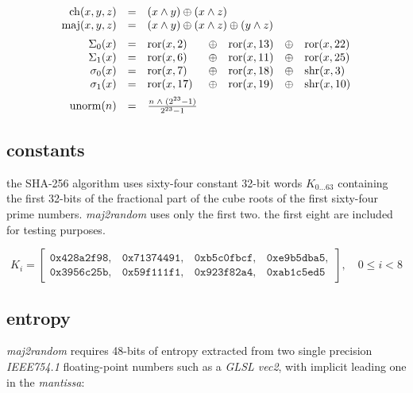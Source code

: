 \documentclass{scrartcl}
\begin{document}
\[
\begin{array}{rclclcl}
\mathrm{ch}(x,y,z)  & = & \multicolumn{5}{l}{(x \land y) \oplus (x \land z)} \\
\mathrm{maj}(x,y,z) & = & \multicolumn{5}{l}{(x \land y) \oplus (x \land z) \oplus (y \land z)} \\[0.5em]
\Sigma_0(x) & = & \mathrm{ror}(x,2)  & \oplus & \mathrm{ror}(x,13) & \oplus & \mathrm{ror}(x,22) \\
\Sigma_1(x) & = & \mathrm{ror}(x,6)  & \oplus & \mathrm{ror}(x,11) & \oplus & \mathrm{ror}(x,25) \\
\sigma_0(x) & = & \mathrm{ror}(x,7)  & \oplus & \mathrm{ror}(x,18) & \oplus & \mathrm{shr}(x,3) \\
\sigma_1(x) & = & \mathrm{ror}(x,17) & \oplus & \mathrm{ror}(x,19) & \oplus & \mathrm{shr}(x,10) \\[0.5em]
\mathrm{unorm}(n) & = & \frac {n \; \land \; (2^{23}-1)}{2^{23}-1}
\end{array}
\]

\newpage
\subsection*{constants}

\noindent
the SHA-256 algorithm uses sixty-four constant 32-bit words $K_{0...63}$
containing the first 32-bits of the fractional part of the cube roots of the
first sixty-four prime numbers. \textit{maj2random} uses only the first two.
the first eight are included for testing purposes.

\[
K_i = \begin{bmatrix}
    \mathtt{0x428a2f98}, & \mathtt{0x71374491}, & \mathtt{0xb5c0fbcf}, & \mathtt{0xe9b5dba5}, \\
    \mathtt{0x3956c25b}, & \mathtt{0x59f111f1}, & \mathtt{0x923f82a4}, & \mathtt{0xab1c5ed5}
\end{bmatrix}, \quad 0 \le i < 8
\]

\vspace{1em}

\subsection*{entropy}

\noindent
\textit{maj2random} requires 48-bits of entropy extracted from two single
precision \emph{IEEE754.1} floating-point numbers such as a \emph{GLSL vec2},
with implicit leading one in the \emph{mantissa}:
\end{document}
